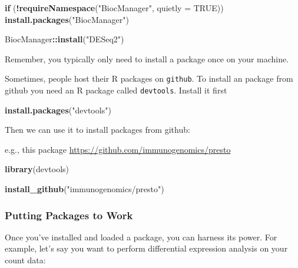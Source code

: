 \documentclass[
]{book}
\newenvironment{Shaded}{\begin{snugshade}}{\end{snugshade}}
\newcommand{\AttributeTok}[1]{\textcolor[rgb]{0.13,0.29,0.53}{#1}}
\newcommand{\ConstantTok}[1]{\textcolor[rgb]{0.56,0.35,0.01}{#1}}
\newcommand{\ControlFlowTok}[1]{\textcolor[rgb]{0.13,0.29,0.53}{\textbf{#1}}}
\newcommand{\FunctionTok}[1]{\textcolor[rgb]{0.13,0.29,0.53}{\textbf{#1}}}
\newcommand{\NormalTok}[1]{#1}
\newcommand{\SpecialCharTok}[1]{\textcolor[rgb]{0.81,0.36,0.00}{\textbf{#1}}}
\newcommand{\StringTok}[1]{\textcolor[rgb]{0.31,0.60,0.02}{#1}}
\begin{document}
\begin{Shaded}
\begin{Highlighting}[]
\ControlFlowTok{if}\NormalTok{ (}\SpecialCharTok{!}\FunctionTok{requireNamespace}\NormalTok{(}\StringTok{"BiocManager"}\NormalTok{, }\AttributeTok{quietly =} \ConstantTok{TRUE}\NormalTok{))}
    \FunctionTok{install.packages}\NormalTok{(}\StringTok{"BiocManager"}\NormalTok{)}

\NormalTok{BiocManager}\SpecialCharTok{::}\FunctionTok{install}\NormalTok{(}\StringTok{"DESeq2"}\NormalTok{)}
\end{Highlighting}
\end{Shaded}

Remember, you typically only need to install a package once on your machine.

Sometimes, people host their R packages on \texttt{github}. To install an package from
github you need an R package called \texttt{devtools}. Install it first

\begin{Shaded}
\begin{Highlighting}[]
\FunctionTok{install.packages}\NormalTok{(}\StringTok{"devtools"}\NormalTok{)}
\end{Highlighting}
\end{Shaded}

Then we can use it to install packages from github:

e.g., this package \url{https://github.com/immunogenomics/presto}

\begin{Shaded}
\begin{Highlighting}[]
\FunctionTok{library}\NormalTok{(devtools)}

\FunctionTok{install\_github}\NormalTok{(}\StringTok{"immunogenomics/presto"}\NormalTok{)}
\end{Highlighting}
\end{Shaded}

\hypertarget{putting-packages-to-work}{%
\subsubsection{Putting Packages to Work}\label{putting-packages-to-work}}

Once you've installed and loaded a package, you can harness its power. For example, let's say you want to perform differential expression analysis on your count data:
\end{document}
